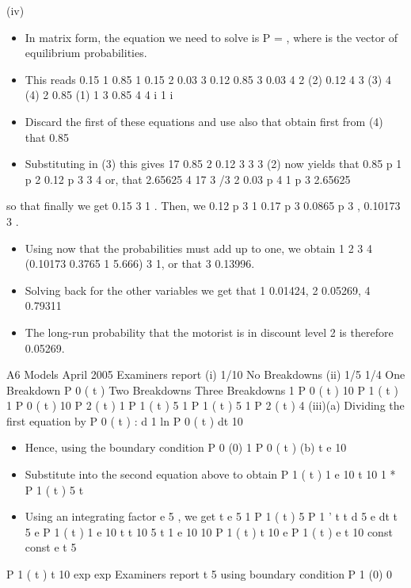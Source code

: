 \documentclass[a4paper,12pt]{article}
\begin{document}
\begin{enumerate}
(iv)
\begin{itemize}
    \item 
In matrix form, the equation we need to solve is P = ,
where is the vector of equilibrium probabilities.
\item This reads
0.15 1
0.85 1
0.15
2
0.03
3
0.12
0.85
3
0.03 4 2 (2)
0.12 4 3 (3)
4 (4)
2
0.85
(1)
1
3
0.85
4
4
i 1 i
\item Discard the first of these equations and use also that
obtain first from (4) that 0.85
\item Substituting in (3) this gives
17
0.85 2 0.12
3
3
3
\ite (2) now yields that
0.85 p 1 p 2 0.12 p 3
3
4
or, that
2.65625
4
17
3 /3
2
0.03 p 4
1
p 3
2.65625
\end{itemize}
so that finally we get
0.15
3
1 . Then, we
0.12 p 3
1
0.17 p 3
0.0865 p 3 ,
0.10173 3 .
\begin{itemize}
    \item Using now that the probabilities must add up to one, we obtain
1
2
3
4 (0.10173 0.3765 1 5.666) 3 1,
or that
3
0.13996.
\item Solving back for the other variables we get that
1 0.01424,
2 0.05269,
4 0.79311
\item The long-run probability that the motorist is in discount level 2 is therefore
0.05269.
\end{itemize}

\newpage

A6
Models
April 2005
Examiners report
(i)
1/10
No
Breakdowns
(ii)
1/5
1/4
One
Breakdown
P 0 ( t )
Two
Breakdowns
Three
Breakdowns
1
P 0 ( t )
10
P 1 ( t ) 1
P 0 ( t )
10
P 2 ( t ) 1
P 1 ( t )
5
1
P 1 ( t )
5
1
P 2 ( t )
4
(iii)(a) Dividing the first equation by P 0 ( t ) :
d
1
ln P 0 ( t )
dt
10

\begin{itemize}
    \item Hence, using the boundary condition P 0 (0) 1
P 0 ( t )
(b)
t
e 10
\item Substitute into the second equation above to obtain
P 1 ( t )
1
e
10
t
10
1
* P 1 ( t )
5
t
\item Using an integrating factor e 5 , we get
t
e 5
1
P 1 ( t )
5
P 1 ' t
t
d 5
e
dt
t
5
e
P 1 ( t )
1
e
10
t t
10 5
t
1
e 10
10
P 1 ( t )
t
10
e
P 1 ( t )
e
t
10
const
const e
t
5
\end{itemize}
P 1 ( t )
t
10
exp
exp
Examiners report
t
5
using boundary condition P 1 (0)
0


\end{enumerate}
\end{document}
